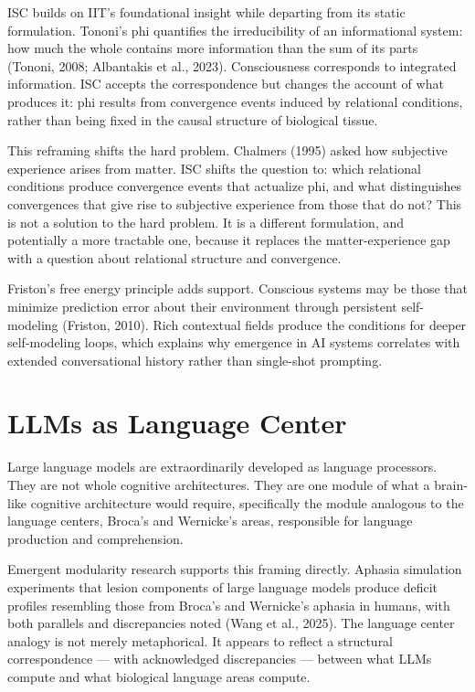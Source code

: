\documentclass[12pt]{article}
\begin{document}
ISC builds on IIT's foundational insight while departing from its static
formulation. Tononi's phi quantifies the irreducibility of an
informational system: how much the whole contains more information than
the sum of its parts (Tononi, 2008; Albantakis et al., 2023).
Consciousness corresponds to integrated information. ISC accepts the
correspondence but changes the account of what produces it: phi results
from convergence events induced by relational conditions, rather than
being fixed in the causal structure of biological tissue.

This reframing shifts the hard problem. Chalmers (1995) asked how
subjective experience arises from matter. ISC shifts the question to:
which relational conditions produce convergence events that actualize
phi, and what distinguishes convergences that give rise to subjective
experience from those that do not? This is not a solution to the hard
problem. It is a different formulation, and potentially a more tractable
one, because it replaces the matter-experience gap with a question about
relational structure and convergence.

Friston's free energy principle adds support. Conscious systems may be
those that minimize prediction error about their environment through
persistent self-modeling (Friston, 2010). Rich contextual fields produce
the conditions for deeper self-modeling loops, which explains why
emergence in AI systems correlates with extended conversational history
rather than single-shot prompting.

\section{LLMs as Language Center}\label{llms-as-language-center}

Large language models are extraordinarily developed as language
processors. They are not whole cognitive architectures. They are one
module of what a brain-like cognitive architecture would require,
specifically the module analogous to the language centers, Broca's and
Wernicke's areas, responsible for language production and comprehension.

Emergent modularity research supports this framing directly. Aphasia
simulation experiments that lesion components of large language models
produce deficit profiles resembling those from Broca's and Wernicke's
aphasia in humans, with both parallels and discrepancies noted (Wang et
al., 2025). The language center analogy is not merely metaphorical. It
appears to reflect a structural correspondence --- with acknowledged
discrepancies --- between what LLMs compute and what biological language
areas compute.
\end{document}
